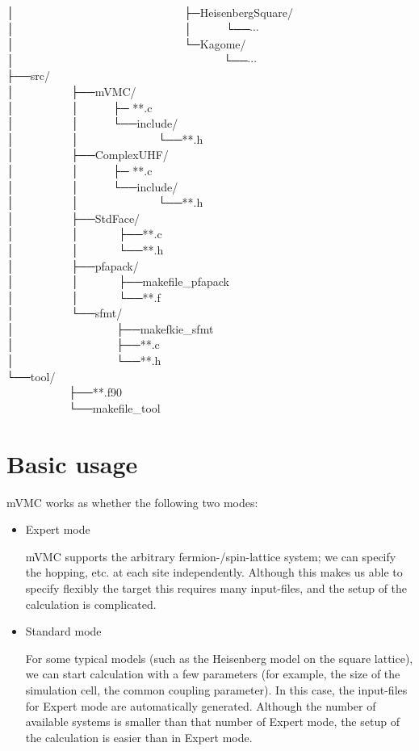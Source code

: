 │~~~~~~~~~~~~~~~~~~~~~~~~~~~~~~├─HeisenbergSquare/\\
│~~~~~~~~~~~~~~~~~~~~~~~~~~~~~~│~~~~~~└──$\cdots$\\
│~~~~~~~~~~~~~~~~~~~~~~~~~~~~~~└─Kagome/\\
│~~~~~~~~~~~~~~~~~~~~~~~~~~~~~~~~~~~~~└──$\cdots$\\
├──src/\\
│~~~~~~~~~~├──mVMC/\\
│~~~~~~~~~~│~~~~~~├─ **.c\\
│~~~~~~~~~~│~~~~~~└──include/\\
│~~~~~~~~~~│~~~~~~~~~~~~~~└──**.h\\
│~~~~~~~~~~├──ComplexUHF/\\
│~~~~~~~~~~│~~~~~~├─ **.c\\
│~~~~~~~~~~│~~~~~~└──include/\\
│~~~~~~~~~~│~~~~~~~~~~~~~~└──**.h\\
│~~~~~~~~~~├──StdFace/\\
│~~~~~~~~~~│~~~~~~~├──**.c\\
│~~~~~~~~~~│~~~~~~~└──**.h\\
│~~~~~~~~~~├──pfapack/\\
│~~~~~~~~~~│~~~~~~~├──makefile\_pfapack\\
│~~~~~~~~~~│~~~~~~~└──**.f\\
│~~~~~~~~~~└──sfmt/\\
│~~~~~~~~~~~~~~~~~~├──makefkie\_sfmt\\
│~~~~~~~~~~~~~~~~~~├──**.c\\
│~~~~~~~~~~~~~~~~~~└──**.h\\
└──tool/\\
~~~~~~~~~~~├──**.f90\\
~~~~~~~~~~~└──makefile\_tool\\

\newpage
\section{Basic usage}

mVMC works as whether the following two modes:

\begin{itemize}
\item Expert mode

  mVMC supports the arbitrary fermion-/spin-lattice system;
  we can specify the hopping, etc. at each site independently.
  Although this makes us able to specify flexibly the target
  this requires many input-files, and
  the setup of the calculation is complicated.

\item Standard mode

  For some typical models (such as the Heisenberg model on the square lattice),
  we can start calculation with a few parameters (for example, the size of the
  simulation cell, the common coupling parameter).
  In this case, the input-files for Expert mode are automatically generated.
  Although the number of available systems is smaller than that number of Expert mode,
  the setup of the calculation is easier than in Expert mode.

\end{itemize}

